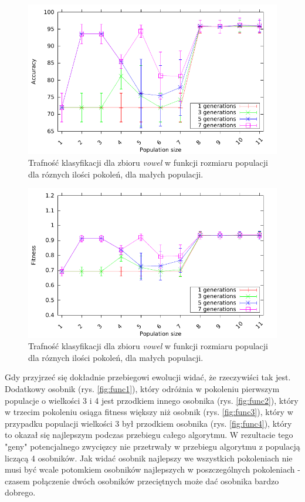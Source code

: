 	\begin{figure}
		\includegraphics[scale=0.90]{figures/results/accuracy/accuracy-vowel-detailed}
		\caption{Trafność klasyfikacji dla zbioru \emph{vowel} w funkcji rozmiaru populacji dla róznych ilości pokoleń, dla małych populacji.\label{fig:acc-vowel-detailed}}
	\end{figure}
		
	\begin{figure}
		\includegraphics[scale=0.90]{figures/results/fitness/fitness-vowel-detailed}
		\caption{Trafność klasyfikacji dla zbioru \emph{vowel} w funkcji rozmiaru populacji dla róznych ilości pokoleń, dla małych populacji.\label{fig:fit-vowel-detailed}}
	\end{figure}

    	
	\FloatBarrier
	 Gdy przyjrzeć się dokładnie przebiegowi ewolucji widać, że rzeczywiści tak jest. Dodatkowy osobnik (rys. \ref{fig:func1}), który odróżnia w pokoleniu pierwszym populacje o wielkości 3 i 4 jest przodkiem innego osobnika (rys. \ref{fig:func2}), który w trzecim pokoleniu osiąga fitness większy niż osobnik (rys. \ref{fig:func3}), który w przypadku populacji wielkości 3 był przodkiem osobnika (rys. \ref{fig:func4}), który to okazał się najlepszym podczas przebiegu całego algorytmu. W rezultacie tego "geny" potencjalnego zwycięzcy nie przetrwały w przebiegu algorytmu z populacją liczącą 4 osobników. Jak widać osobnik najlepszy we wszystkich pokoleniach nie musi być wcale potomkiem osobników najlepszych w poszczególnych pokoleniach - czasem połączenie dwóch osobników przeciętnych może dać osobnika bardzo dobrego. 	
	 
